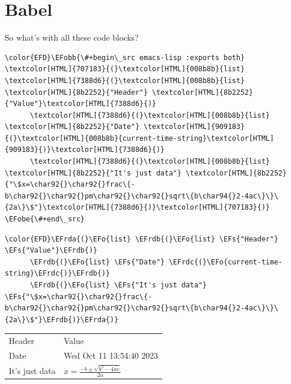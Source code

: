 \documentclass[presentation, t]{beamer}
\newcommand\efstrut{\vrule height 2.1ex depth 0.8ex width 0pt}
\newcommand{\EFs}[1]{\textcolor{EFs}{#1}} %
\newcommand{\EFo}[1]{\textcolor{EFo}{#1}} %
\newcommand{\EFobb}[1]{\colorbox{Efobb}{\efstrut{}\textcolor{EFobb}{#1}}} %
\newcommand{\EFobe}[1]{\colorbox{Efobe}{\efstrut{}\textcolor{EFobe}{#1}}} %
\newcommand{\EFrda}[1]{\textcolor{EFrda}{#1}} %
\newcommand{\EFrdb}[1]{\textcolor{EFrdb}{#1}} %
\newcommand{\EFrdc}[1]{\textcolor{EFrdc}{#1}} %
\begin{document}
\section{Babel}
\label{sec:orgc358cf1}
\begin{frame}[label={sec:orgd2e434e},fragile]{So what's with all these code blocks?}
 \bigskip
\begin{Code}
\begin{Verbatim}
\color{EFD}\EFobb{\#+begin\_src emacs-lisp :exports both}
\textcolor[HTML]{707183}{(}\textcolor[HTML]{008b8b}{list} \textcolor[HTML]{7388d6}{(}\textcolor[HTML]{008b8b}{list} \textcolor[HTML]{8b2252}{"Header"} \textcolor[HTML]{8b2252}{"Value"}\textcolor[HTML]{7388d6}{)}
      \textcolor[HTML]{7388d6}{(}\textcolor[HTML]{008b8b}{list} \textcolor[HTML]{8b2252}{"Date"} \textcolor[HTML]{909183}{(}\textcolor[HTML]{008b8b}{current-time-string}\textcolor[HTML]{909183}{)}\textcolor[HTML]{7388d6}{)}
      \textcolor[HTML]{7388d6}{(}\textcolor[HTML]{008b8b}{list} \textcolor[HTML]{8b2252}{"It's just data"} \textcolor[HTML]{8b2252}{"\$x=\char92{}\char92{}frac\{-b\char92{}\char92{}pm\char92{}\char92{}sqrt\{b\char94{}2-4ac\}\}\{2a\}\$"}\textcolor[HTML]{7388d6}{)}\textcolor[HTML]{707183}{)}
\EFobe{\#+end\_src}
\end{Verbatim}
\end{Code}

\begin{Code}
\begin{Verbatim}
\color{EFD}\EFrda{(}\EFo{list} \EFrdb{(}\EFo{list} \EFs{"Header"} \EFs{"Value"}\EFrdb{)}
      \EFrdb{(}\EFo{list} \EFs{"Date"} \EFrdc{(}\EFo{current-time-string}\EFrdc{)}\EFrdb{)}
      \EFrdb{(}\EFo{list} \EFs{"It's just data"} \EFs{"\$x=\char92{}\char92{}frac\{-b\char92{}\char92{}pm\char92{}\char92{}sqrt\{b\char94{}2-4ac\}\}\{2a\}\$"}\EFrdb{)}\EFrda{)}
\end{Verbatim}
\end{Code}

\begin{center}
\begin{tabular}{ll}
\toprule
Header & Value\\[0pt]
Date & Wed Oct 11 13:54:40 2023\\[0pt]
It's just data & \(x=\frac{-b\pm\sqrt{b^2-4ac}}{2a}\)\\[0pt]
\bottomrule
\end{tabular}
\end{center}
\end{frame}
\end{document}
